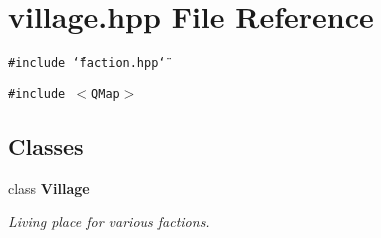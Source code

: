 \section{village.hpp File Reference}
\label{village_8hpp}
{\tt \#include \char`\"{}faction.hpp\char`\"{}}\par
{\tt \#include $<$QMap$>$}\par
\subsection*{Classes}
\begin{CompactItemize}
\item 
class {\bf Village}
\begin{CompactList}\small\item\em Living place for various factions. \item\end{CompactList}\end{CompactItemize}
